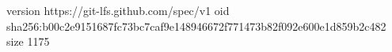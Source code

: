 version https://git-lfs.github.com/spec/v1
oid sha256:b00c2e9151687fc73bc7caf9e148946672f771473b82f092e600e1d859b2c482
size 1175
